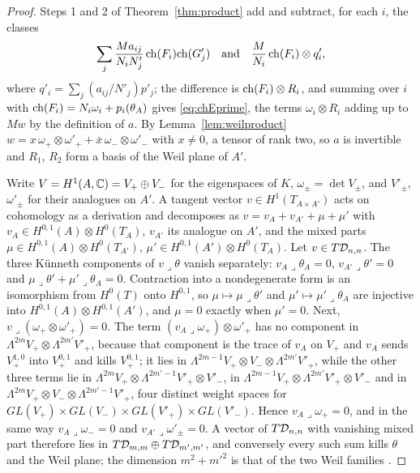 \begin{proof}
Steps 1 and 2 of Theorem~\ref{thm:product} add and subtract, for each $i$, the classes
\[
\sum_{j}\frac{Ma_{ij}}{N_{i}N'_{j}}\,\mathrm{ch}(F_{i})\mathrm{ch}(G'_{j})\quad\text{and}\quad\frac{M}{N_{i}}\,\mathrm{ch}(F_{i})\otimes q'_{i},
\]
where $q'_{i}=\sum_{j}(a_{ij}/N'_{j})p'_{j}$; the difference is $\mathrm{ch}(F_{i})\otimes R_{i}$, and summing over $i$ with $\mathrm{ch}(F_{i})=N_{i}\omega_{i}+p_{i}(\theta_{A})$ gives \eqref{eq:chEprime}, the terms $\omega_{i}\otimes R_{i}$ adding up to $Mw$ by the definition of $a$. By Lemma~\ref{lem:weilproduct} $w=x\,\omega_{+}\otimes\omega'_{+}+\bar x\,\omega_{-}\otimes\omega'_{-}$ with $x\ne0$, a tensor of rank two, so $a$ is invertible and $R_{1}$, $R_{2}$ form a basis of the Weil plane of $A'$.

Write $V=H^{1}(A,\mathbb{C})=V_{+}\oplus V_{-}$ for the eigenspaces of $K$, $\omega_{\pm}=\det V_{\pm}$, and $V'_{\pm}$, $\omega'_{\pm}$ for their analogues on $A'$. A tangent vector $v\in H^{1}(T_{A\times A'})$ acts on cohomology as a derivation and decomposes as $v=v_{A}+v_{A'}+\mu+\mu'$ with $v_{A}\in H^{0,1}(A)\otimes H^{0}(T_{A})$, $v_{A'}$ its analogue on $A'$, and the mixed parts $\mu\in H^{0,1}(A)\otimes H^{0}(T_{A'})$, $\mu'\in H^{0,1}(A')\otimes H^{0}(T_{A})$. Let $v\in T\mathcal{D}_{n,n}$. The three K\"unneth components of $v\lrcorner\theta$ vanish separately: $v_{A}\lrcorner\theta_{A}=0$, $v_{A'}\lrcorner\theta'=0$ and $\mu\lrcorner\theta'+\mu'\lrcorner\theta_{A}=0$. Contraction into a nondegenerate form is an isomorphism from $H^{0}(T)$ onto $H^{0,1}$, so $\mu\mapsto\mu\lrcorner\theta'$ and $\mu'\mapsto\mu'\lrcorner\theta_{A}$ are injective into $H^{0,1}(A)\otimes H^{0,1}(A')$, and $\mu=0$ exactly when $\mu'=0$. Next, $v\lrcorner(\omega_{+}\otimes\omega'_{+})=0$. The term $(v_{A}\lrcorner\omega_{+})\otimes\omega'_{+}$ has no component in $\Lambda^{2m}V_{+}\otimes\Lambda^{2m'}V'_{+}$, because that component is the trace of $v_{A}$ on $V_{+}$ and $v_{A}$ sends $V_{+}^{1,0}$ into $V_{+}^{0,1}$ and kills $V_{+}^{0,1}$; it lies in $\Lambda^{2m-1}V_{+}\otimes V_{-}\otimes\Lambda^{2m'}V'_{+}$, while the other three terms lie in $\Lambda^{2m}V_{+}\otimes\Lambda^{2m'-1}V'_{+}\otimes V'_{-}$, in $\Lambda^{2m-1}V_{+}\otimes\Lambda^{2m'}V'_{+}\otimes V'_{-}$ and in $\Lambda^{2m}V_{+}\otimes V_{-}\otimes\Lambda^{2m'-1}V'_{+}$, four distinct weight spaces for $GL(V_{+})\times GL(V_{-})\times GL(V'_{+})\times GL(V'_{-})$. Hence $v_{A}\lrcorner\omega_{+}=0$, and in the same way $v_{A}\lrcorner\omega_{-}=0$ and $v_{A'}\lrcorner\omega'_{\pm}=0$. A vector of $T\mathcal{D}_{n,n}$ with vanishing mixed part therefore lies in $T\mathcal{D}_{m,m}\oplus T\mathcal{D}_{m',m'}$, and conversely every such sum kills $\theta$ and the Weil plane; the dimension $m^{2}+m'^{2}$ is that of the two Weil families \cite{Weil77}.


\end{proof}
